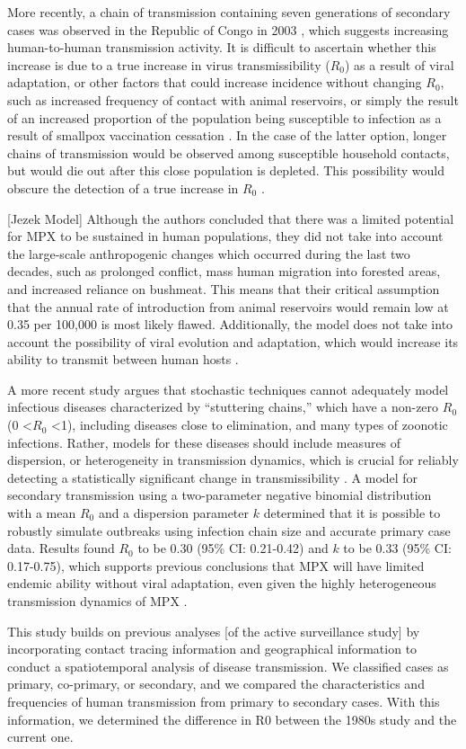 More recently, a chain of transmission containing seven generations of secondary cases was observed in the Republic of Congo in 2003 \cite{Learned2005}, which suggests increasing human-to-human transmission activity. It is difficult to ascertain whether this increase is due to a true increase in virus transmissibility ($R_{0}$) as a result of viral adaptation, or other factors that could increase incidence without changing $R_{0}$, such as increased frequency of contact with animal reservoirs, or simply the result of an increased proportion of the population being susceptible to infection as a result of smallpox vaccination cessation \cite{Blumberg2014, DiGiulio2004}. In the case of the latter option, longer chains of transmission would be observed among susceptible household contacts, but would die out after this close population is depleted. This possibility would obscure the detection of a true increase in $R_{0}$ \cite{Blumberg2014}.

[Jezek Model] Although the authors concluded that there was a limited potential for MPX to be sustained in human populations, they did not take into account the large-scale anthropogenic changes which occurred during the last two decades, such as prolonged conflict, mass human migration into forested areas, and increased reliance on bushmeat. This means that their critical assumption that the annual rate of introduction from animal reservoirs would remain low at 0.35 per 100,000 is most likely flawed. Additionally, the model does not take into account the possibility of viral evolution and adaptation, which would increase its ability to transmit between human hosts \cite{Kugelman2014}.

A more recent study argues that stochastic techniques cannot adequately model infectious diseases characterized by “stuttering chains,” which have a non-zero $R_{0}$ (0 \textless $R_{0}$ \textless 1), including diseases close to elimination, and many types of zoonotic infections. Rather, models for these diseases should include measures of dispersion, or heterogeneity in transmission dynamics, which is crucial for reliably detecting a statistically significant change in transmissibility \cite{Blumberg2013}. A model for secondary transmission using a two-parameter negative binomial distribution with a mean $R_{0}$ and a dispersion parameter $k$ determined that it is possible to robustly simulate outbreaks using infection chain size and accurate primary case data. Results found $R_{0}$ to be 0.30 (95\% CI: 0.21-0.42) and $k$ to be 0.33 (95\% CI: 0.17-0.75), which supports previous conclusions that MPX will have limited endemic ability without viral adaptation, even given the highly heterogeneous transmission dynamics of MPX \cite{Blumberg2013}.

This study builds on previous analyses [of the active surveillance study] by incorporating contact tracing information and geographical information to conduct a spatiotemporal analysis of disease transmission. We classified cases as primary, co-primary, or secondary, and we compared the characteristics and frequencies of human transmission from primary to secondary cases. With this information, we determined the difference in R0 between the 1980s study and the current one. 

